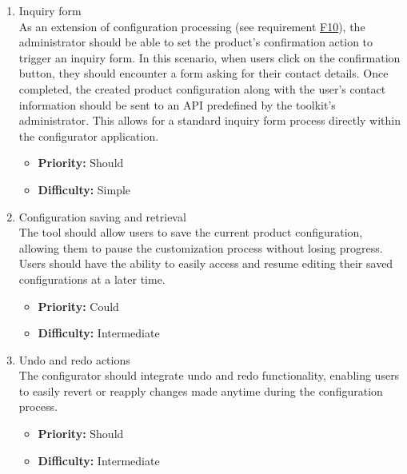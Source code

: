 \begin{enumerate}[label=\textbf{F\arabic*:}, leftmargin=*]
\item \label{itm:F11} Inquiry form
\vspace{2pt}
\\As an extension of configuration processing (see requirement \hyperref[itm:F10]{F10}), the administrator should be able to set the product's confirmation action to trigger an inquiry form. In this scenario, when users click on the confirmation button, they should encounter a form asking for their contact details. Once completed, the created product configuration along with the user's contact information should be sent to an API predefined by the toolkit's administrator. This allows for a standard inquiry form process directly within the configurator application.
\begin{itemize}[noitemsep, label=\trianglebullet]
    \item \textbf{Priority:} Should
    \item \textbf{Difficulty:} Simple
\end{itemize}
\vspace{4pt}

\item \label{itm:F12} Configuration saving and retrieval
\vspace{2pt}
\\The tool should allow users to save the current product configuration, allowing them to pause the customization process without losing progress. Users should have the ability to easily access and resume editing their saved configurations at a later time.
\begin{itemize}[noitemsep, label=\trianglebullet]
   \item \textbf{Priority:} Could
    \item \textbf{Difficulty:} Intermediate
\end{itemize}
\vspace{4pt}

\item \label{itm:F13} Undo and redo actions
\vspace{2pt}
\\The configurator should integrate undo and redo functionality, enabling users to easily revert or reapply changes made anytime during the configuration process.
\begin{itemize}[noitemsep, label=\trianglebullet]
    \item \textbf{Priority:} Should
    \item \textbf{Difficulty:} Intermediate
\end{itemize}
\vspace{4pt}


\end{enumerate}
